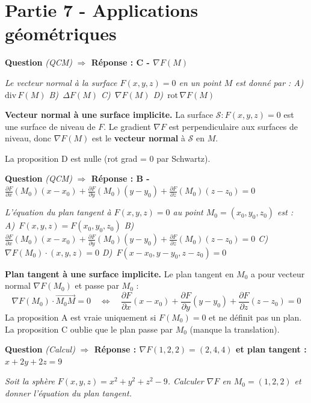\documentclass[11pt,a4paper]{article}
\newcounter{qnum}
\newcommand{\qtitre}[2]{%
  \stepcounter{qnum}%
  \medskip\noindent
  \textbf{\color{bleutexte}Question \theqnum}\enspace
  \textit{(#1)}\enspace
  \textcolor{vertok}{\textbf{$\Rightarrow$ Réponse : #2}}
  \par\smallskip
}
\newcommand{\qenonce}[1]{%
  \begin{mdframed}[backgroundcolor=grisbox, linewidth=0pt,
    innerleftmargin=8pt, innerrightmargin=8pt,
    innertopmargin=5pt, innerbottommargin=5pt,
    skipabove=2pt, skipbelow=4pt]
  \small\textit{#1}
  \end{mdframed}
}
\begin{document}
\section{Partie 7 - Applications géométriques}

\qtitre{QCM}{C - $\nabla F(M)$}
\qenonce{Le vecteur normal à la surface $F(x,y,z)=0$ en un point $M$ est donné par :
\quad A)~$\text{div}\,F(M)$
\quad B)~$\Delta F(M)$
\quad C)~$\nabla F(M)$
\quad D)~$\text{rot}\,\nabla F(M)$}

\begin{methodebox}
\textbf{Vecteur normal à une surface implicite.} La surface $\mathcal{S} : F(x,y,z)=0$ est une surface de niveau de $F$. Le gradient $\nabla F$ est perpendiculaire aux surfaces de niveau, donc $\nabla F(M)$ est le \textbf{vecteur normal} à $\mathcal{S}$ en $M$.

La proposition D est nulle (rot grad = 0 par Schwartz).
\end{methodebox}

\qtitre{QCM}{B - $\frac{\partial F}{\partial x}(M_0)(x-x_0)+\frac{\partial F}{\partial y}(M_0)(y-y_0)+\frac{\partial F}{\partial z}(M_0)(z-z_0)=0$}
\qenonce{L'équation du plan tangent à $F(x,y,z)=0$ au point $M_0=(x_0,y_0,z_0)$ est :
\quad A)~$F(x,y,z)=F(x_0,y_0,z_0)$
\quad B)~$\frac{\partial F}{\partial x}(M_0)(x-x_0)+\frac{\partial F}{\partial y}(M_0)(y-y_0)+\frac{\partial F}{\partial z}(M_0)(z-z_0)=0$
\quad C)~$\nabla F(M_0)\cdot(x,y,z)=0$
\quad D)~$F(x-x_0,y-y_0,z-z_0)=0$}

\begin{methodebox}
\textbf{Plan tangent à une surface implicite.} Le plan tangent en $M_0$ a pour vecteur normal $\nabla F(M_0)$ et passe par $M_0$ :
$$\nabla F(M_0)\cdot\overrightarrow{M_0M} = 0 \quad\Longleftrightarrow\quad \frac{\partial F}{\partial x}(x-x_0)+\frac{\partial F}{\partial y}(y-y_0)+\frac{\partial F}{\partial z}(z-z_0) = 0$$
La proposition A est vraie uniquement si $F(M_0)=0$ et ne définit pas un plan. La proposition C oublie que le plan passe par $M_0$ (manque la translation).
\end{methodebox}

\qtitre{Calcul}{$\nabla F(1,2,2) = (2,4,4)$ \quad et \quad plan tangent : $x+2y+2z=9$}
\qenonce{Soit la sphère $F(x,y,z)=x^2+y^2+z^2-9$. Calculer $\nabla F$ en $M_0=(1,2,2)$ et donner l'équation du plan tangent.}
\end{document}

